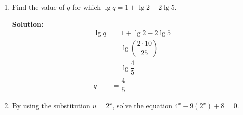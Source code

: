 \documentclass{report}
\newcommand{\sol}{\vspace{0.2cm}\textbf{Solution:}\vspace{0.2cm}}
\begin{document}
\begin{multicols*}{2}
\begin{enumerate}[leftmargin=*]
\begin{enumerate}
\begin{enumerate}[label=(\roman*)]
                                  \sol{}
                                  \begin{align*}
                                      240(1.06)^n & = 240(1.06)^{20} \\
                                                  & \approx 770
                                  \end{align*}

                            \item the year in which the population first reached 2500.

                                  \sol{}
                                  \begin{align*}
                                      240(1.06)^n & = 2500                                    \\
                                      (1.06)^n    & = \dfrac{2500}{240}                       \\
                                                  & = \dfrac{25}{24}                          \\
                                      n           & = \log_{1.06} \dfrac{250}{24}             \\
                                                  & = \dfrac{\log \dfrac{250}{24}}{\log 1.06} \\
                                                  & \approx 40
                                  \end{align*}
                                  $\therefore$ The year is 1840.
                        \end{enumerate}

                        \newpage
                  \item Find the value of $q$ for which $\lg q=1+\lg 2-2 \lg 5$.

                        \sol{}
                        \begin{align*}
                            \lg q & = 1 + \lg 2 - 2 \lg 5          \\
                                  & = \lg (\dfrac{2 \cdot 10}{25}) \\
                                  & = \lg \dfrac{4}{5}             \\
                            q     & = \dfrac{4}{5}
                        \end{align*}

                  \item By using the substitution $u=2^x$, solve the equation
                        $4^x-9\left(2^x\right)+8=0$.


\end{enumerate}
\end{enumerate}
\end{multicols*}
\end{document}
